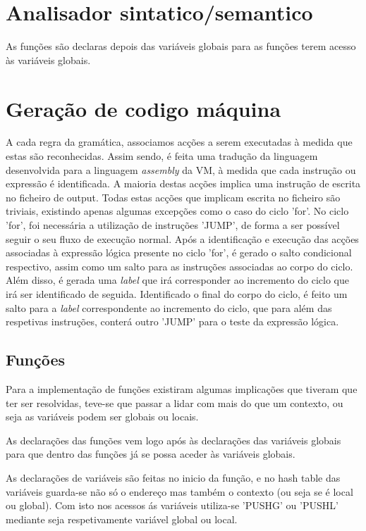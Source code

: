\documentclass[a4paper,10pt]{report}
\begin{document}
\section{Analisador sintatico/semantico}

As funções são declaras depois das variáveis globais para as funções terem acesso às variáveis globais.

\section{Geração de codigo máquina}
    A cada regra da gramática, associamos acções a serem executadas à medida que estas são reconhecidas. Assim sendo, é feita uma tradução da linguagem desenvolvida para a linguagem \emph{assembly} da VM, à medida que cada instrução ou expressão é identificada. A maioria destas acções implica uma instrução de escrita no ficheiro de output. Todas estas acções que implicam escrita no ficheiro são triviais, existindo apenas algumas excepções como o caso do ciclo 'for'.
	No ciclo 'for', foi necessária a utilização de instruções 'JUMP', de forma a ser possível seguir o seu fluxo de execução normal. Após a identificação e execução das acções associadas à expressão lógica presente no ciclo 'for', é gerado o salto condicional respectivo, assim como um salto para as instruções associadas ao corpo do ciclo. Além disso, é gerada uma \emph{label} que irá corresponder ao incremento do ciclo que irá ser identificado de seguida. Identificado o final do corpo do ciclo, é feito um salto para a \emph{label} correspondente ao incremento do ciclo, que para além das respetivas instruções, conterá outro 'JUMP' para o teste da expressão lógica.

\subsection{Funções}

Para a implementação de funções existiram algumas implicações que tiveram que ter ser resolvidas, teve-se que passar a lidar com mais do que um contexto, ou seja as variáveis podem ser globais ou locais.

As declarações das funções vem logo após às declarações das variáveis globais para que dentro das funções já se possa aceder às variáveis globais.

As declarações de variáveis são feitas no inicio da função, e no hash table das variáveis guarda-se não só o endereço mas também o contexto (ou seja se é local ou global). Com isto nos acessos ás variáveis utiliza-se 'PUSHG' ou 'PUSHL' mediante seja respetivamente variável global ou local.
\end{document}
